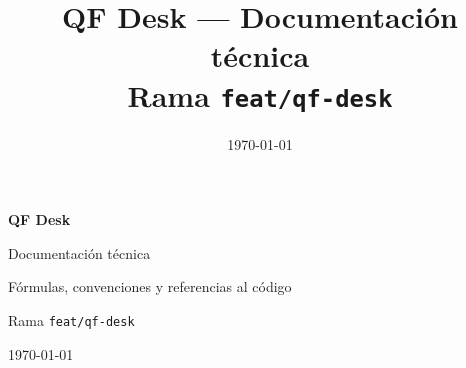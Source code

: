 \documentclass[11pt,a4paper]{report}
\title{QF Desk --- Documentación técnica\\[1.2ex]\large Rama \texttt{feat/qf-desk}}
\author{}
\date{\today}
\begin{document}
\begin{titlepage}
  \centering
  \vspace*{0.2\textheight}
  {\Huge\bfseries QF Desk\par}
  \vspace{0.8cm}
  {\LARGE Documentación técnica\par}
  \vspace{0.5cm}
  {\large Fórmulas, convenciones y referencias al código\par}
  \vspace{2.5cm}
  {\large Rama \texttt{feat/qf-desk}\par}
  \vspace{0.3cm}
  {\large \today\par}
\end{titlepage}
\tableofcontents


















\appendix


\clearpage
{}
{}


\end{document}
